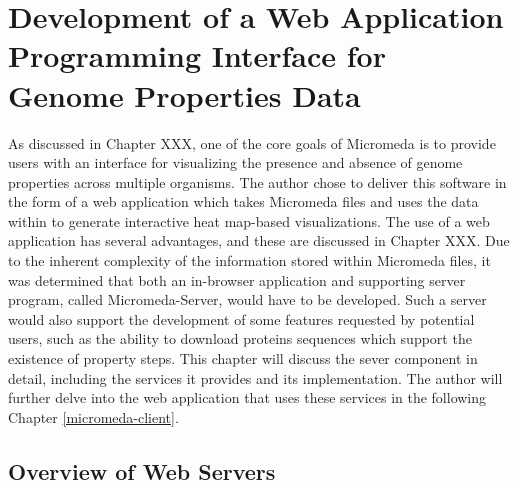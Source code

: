 \chapter{Development of a Web Application Programming Interface for Genome Properties Data} \label{micromeda-server}

As discussed in Chapter XXX, one of the core goals of Micromeda is to provide users with an interface for visualizing the presence and absence of genome properties across multiple organisms. The author chose to deliver this software in the form of a web application which takes Micromeda files and uses the data within to generate interactive heat map-based visualizations. The use of a web application has several advantages, and these are discussed in Chapter XXX. Due to the inherent complexity of the information stored within Micromeda files, it was determined that both an in-browser application and supporting server program, called Micromeda-Server, would have to be developed. Such a server would also support the development of some features requested by potential users, such as the ability to download proteins sequences which support the existence of property steps. This chapter will discuss the sever component in detail, including the services it provides and its implementation. The author will further delve into the web application that uses these services in the following Chapter \ref{micromeda-client}.

\section{Overview of Web Servers}

